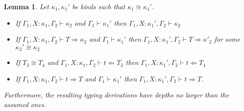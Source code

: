 \documentclass{article}
\newcommand{\tpcheck}[0]{\Leftarrow}
\newcommand{\tpsynth}[0]{\Rightarrow}
\newtheorem{lemma}[theorem]{Lemma}
\begin{document}
\begin{lemma}
  \label{lem:ctxt-conv-class}
  Let \(\kappa_1,\kappa_1'\) be kinds such that \(\kappa_1 \cong \kappa_1'\).
  \begin{itemize}
  \item If \(\Gamma_1,X:\kappa_1,\Gamma_2 \vdash \kappa_2\) and \(\Gamma_1
    \vdash \kappa_1'\) then \(\Gamma_1,X:\kappa_1',\Gamma_2 \vdash \kappa_2\)
   
  \item If \(\Gamma_1,X:\kappa_1,\Gamma_2 \vdash T \tpsynth \kappa_2\) and
    \(\Gamma_1 \vdash \kappa_1'\) then \(\Gamma_1,X:\kappa_1',\Gamma_2 \vdash T
    \tpsynth \kappa'_2\) for some \(\kappa_2' \cong \kappa_2\)

    
  \item If \(T_3 \cong T_4\) and \(\Gamma_1,X:\kappa_1,\Gamma_2 \vdash t
    \tpcheck T_3\) then \(\Gamma_1,X:\kappa_1',\Gamma_2 \vdash t \tpcheck T_4\)
    
  \item If \(\Gamma_1,X:\kappa_1,\Gamma_2 \vdash t \tpsynth T\) and
    \(\Gamma_1 \vdash \kappa_1'\) then \(\Gamma_1,X:\kappa_1',\Gamma_2 \vdash t
    \tpsynth T\).
  \end{itemize}
  Furthermore, the resulting typing derivations have depths no
  larger than the assumed ones.
\end{lemma}
\end{document}
